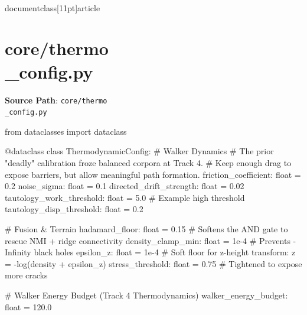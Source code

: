 \\documentclass[11pt]{article}
\begin{document}
\section*{core/thermo\\_config.py}
\textbf{Source Path}: \texttt{core/thermo\\_config.py}\par
\bigskip
\begin{CodeBlock}
from dataclasses import dataclass


@dataclass
class ThermodynamicConfig:
    # Walker Dynamics
    # The prior "deadly" calibration froze balanced corpora at Track 4.
    # Keep enough drag to expose barriers, but allow meaningful path formation.
    friction_coefficient: float = 0.2
    noise_sigma: float = 0.1
    directed_drift_strength: float = 0.02
    tautology_work_threshold: float = 5.0  # Example high threshold
    tautology_disp_threshold: float = 0.2

    # Fusion & Terrain
    hadamard_floor: float = 0.15  # Softens the AND gate to rescue NMI + ridge connectivity
    density_clamp_min: float = 1e-4  # Prevents -Infinity black holes
    epsilon_z: float = 1e-4  # Soft floor for z-height transform: z = -log(density + epsilon_z)
    stress_threshold: float = 0.75  # Tightened to expose more cracks

    # Walker Energy Budget (Track 4 Thermodynamics)
    walker_energy_budget: float = 120.0

\end{CodeBlock}
\end{document}
